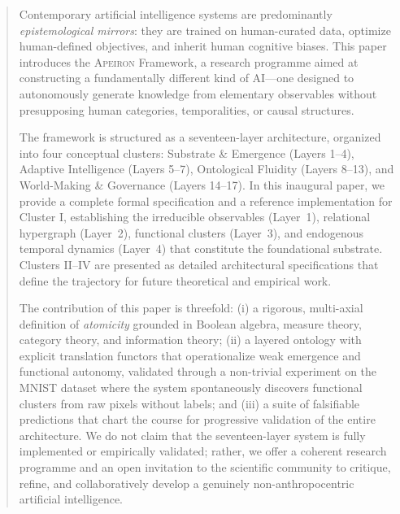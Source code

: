 \begin{abstract}
Contemporary artificial intelligence systems are predominantly \emph{epistemological mirrors}: they are trained on human-curated data, optimize human-defined objectives, and inherit human cognitive biases. This paper introduces the \textsc{Apeiron} Framework, a research programme aimed at constructing a fundamentally different kind of AI---one designed to autonomously generate knowledge from elementary observables without presupposing human categories, temporalities, or causal structures.

The framework is structured as a seventeen-layer architecture, organized into four conceptual clusters: Substrate \& Emergence (Layers 1--4), Adaptive Intelligence (Layers 5--7), Ontological Fluidity (Layers 8--13), and World-Making \& Governance (Layers 14--17). In this inaugural paper, we provide a complete formal specification and a reference implementation for Cluster I, establishing the irreducible observables (Layer~1), relational hypergraph (Layer~2), functional clusters (Layer~3), and endogenous temporal dynamics (Layer~4) that constitute the foundational substrate. Clusters II--IV are presented as detailed architectural specifications that define the trajectory for future theoretical and empirical work.

The contribution of this paper is threefold: (i) a rigorous, multi-axial definition of \emph{atomicity} grounded in Boolean algebra, measure theory, category theory, and information theory; (ii) a layered ontology with explicit translation functors that operationalize weak emergence and functional autonomy, validated through a non-trivial experiment on the MNIST dataset where the system spontaneously discovers functional clusters from raw pixels without labels; and (iii) a suite of falsifiable predictions that chart the course for progressive validation of the entire architecture. We do not claim that the seventeen-layer system is fully implemented or empirically validated; rather, we offer a coherent research programme and an open invitation to the scientific community to critique, refine, and collaboratively develop a genuinely non-anthropocentric artificial intelligence.
\end{abstract}
